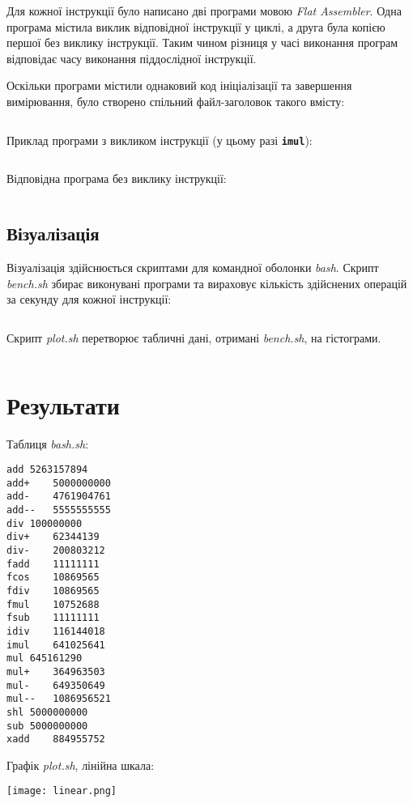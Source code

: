 \documentclass[a4paper]{article}
\newcommand{\code}[1]{\textbf{\texttt{#1}}}
\begin{document}
Для кожної інструкції було написано дві програми мовою \emph{Flat Assembler}.
Одна програма містила виклик відповідної інструкції у циклі, а друга була копією
першої без виклику інструкції. Таким чином різниця у часі виконання програм відповідає
часу виконання піддослідної інструкції.

Оскільки програми містили однаковий код ініціалізації та завершення вимірювання,
було створено спільний файл-заголовок такого вмісту:

\inputminted{text}{ops/macro/bench.asm}

Приклад програми з викликом інструкції (у цьому разі \code{imul}):

\inputminted{text}{ops/imul/bench.asm}

Відповідна програма без виклику інструкції:

\inputminted{text}{ops/imul/baseline.asm}

\subsection{Візуалізація}

Візуалізація здійснюється скриптами для командної оболонки \emph{bash}.
Скрипт \emph{bench.sh} збирає виконувані програми та вираховує кількість здійснених
операцій за секунду для кожної інструкції:

\inputminted{bash}{bench.sh}

Скрипт \emph{plot.sh} перетворює табличні дані, отримані \emph{bench.sh}, на гістограми.

\inputminted{bash}{plot.sh}

\section{Результати}

Таблиця \emph{bash.sh}:

\begin{verbatim}
add	5263157894
add+	5000000000
add-	4761904761
add--	5555555555
div	100000000
div+	62344139
div-	200803212
fadd	11111111
fcos	10869565
fdiv	10869565
fmul	10752688
fsub	11111111
idiv	116144018
imul	641025641
mul	645161290
mul+	364963503
mul-	649350649
mul--	1086956521
shl	5000000000
sub	5000000000
xadd	884955752
\end{verbatim}

Графік \emph{plot.sh}, лінійна шкала:

\begin{center}
  \texttt{[image: linear.png]}
\end{center}
\end{document}
